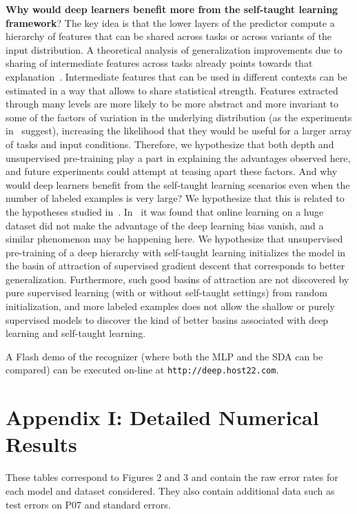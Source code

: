 \documentclass{article} %
\begin{document}
{\bf Why would deep learners benefit more from the self-taught learning framework}?
The key idea is that the lower layers of the predictor compute a hierarchy
of features that can be shared across tasks or across variants of the
input distribution. A theoretical analysis of generalization improvements
due to sharing of intermediate features across tasks already points
towards that explanation~\cite{baxter95a}.
Intermediate features that can be used in different
contexts can be estimated in a way that allows to share statistical 
strength. Features extracted through many levels are more likely to
be more abstract and more invariant to some of the factors of variation
in the underlying distribution (as the experiments in~\citet{Goodfellow2009} suggest),
increasing the likelihood that they would be useful for a larger array
of tasks and input conditions.
Therefore, we hypothesize that both depth and unsupervised
pre-training play a part in explaining the advantages observed here, and future
experiments could attempt at teasing apart these factors.
And why would deep learners benefit from the self-taught learning
scenarios even when the number of labeled examples is very large?
We hypothesize that this is related to the hypotheses studied
in~\citet{Erhan+al-2010}. In~\citet{Erhan+al-2010}
it was found that online learning on a huge dataset did not make the
advantage of the deep learning bias vanish, and a similar phenomenon
may be happening here. We hypothesize that unsupervised pre-training
of a deep hierarchy with self-taught learning initializes the
model in the basin of attraction of supervised gradient descent
that corresponds to better generalization. Furthermore, such good
basins of attraction are not discovered by pure supervised learning
(with or without self-taught settings) from random initialization, and more labeled examples
does not allow the shallow or purely supervised models to discover
the kind of better basins associated
with deep learning and self-taught learning.
 
A Flash demo of the recognizer (where both the MLP and the SDA can be compared) 
can be executed on-line at {\tt http://deep.host22.com}.

\iffalse
\section*{Appendix I: Detailed Numerical Results}

These tables correspond to Figures 2 and 3 and contain the raw error rates for each model and dataset considered.
They also contain additional data such as test errors on P07 and standard errors.
\end{document}
